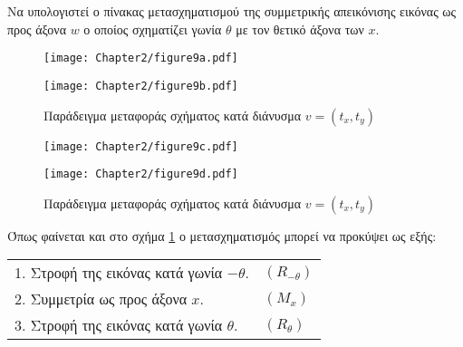 \begin{example}
Να υπολογιστεί ο πίνακας μετασχηματισμού της συμμετρικής απεικόνισης εικόνας ως προς άξονα \( w \) ο οποίος σχηματίζει γωνία \( \theta \) με τον θετικό άξονα των \( x. \)
\end{example}


\begin{figure}[h!]
	\begin{center}
		\begin{minipage}[b]{0.48\textwidth} %
		    \texttt{[image: Chapter2/figure9a.pdf]}
		\end{minipage}%
	\hfill
		\begin{minipage}[b]{0.48\textwidth} %
		    \texttt{[image: Chapter2/figure9b.pdf]}
		\end{minipage}
	\end{center}
\caption{Παράδειγμα μεταφοράς σχήματος κατά διάνυσμα $v = (t_x, t_y)$}
\end{figure}


\begin{figure}[h!]
	\begin{center}
		\begin{minipage}[b]{0.48\textwidth} %
		    \texttt{[image: Chapter2/figure9c.pdf]}
		\end{minipage}%
	\hfill
		\begin{minipage}[b]{0.48\textwidth} %
		    \texttt{[image: Chapter2/figure9d.pdf]}
		\end{minipage}
	\end{center}
\caption{Παράδειγμα μεταφοράς σχήματος κατά διάνυσμα $v = (t_x, t_y)$}
\label{fig:9}
\end{figure}



Όπως φαίνεται και στο σχήμα \ref{fig:9} ο μετασχηματισμός μπορεί να προκύψει ως εξής:
 
\begin{tabular}{m{}m{}}
	1. Στροφή της εικόνας κατά γωνία \( -\theta \). & \( (R_{-\theta}) \) \\
	2. Συμμετρία ως προς άξονα $x$.& \( (M_x) \)\\
	3.  Στροφή της εικόνας κατά γωνία \( \theta \).& \( (R_{\theta}) \)
\end{tabular}


